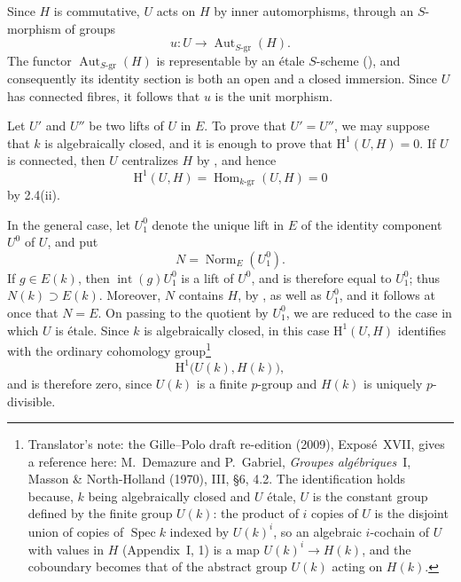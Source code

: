 Since \(H\) is commutative, \(U\) acts on \(H\) by inner
automorphisms, through an \(S\)-morphism of groups
\[
  u:U\longrightarrow\operatorname{Aut}_{S\text{-}\mathrm{gr}}(H).
\]
The functor
\(\operatorname{Aut}_{S\text{-}\mathrm{gr}}(H)\) is representable
by an étale \(S\)-scheme (), and consequently its
identity section is both an open and a closed immersion.  Since
\(U\) has connected fibres, it follows that \(u\) is the unit
morphism.


Let \(U'\) and \(U''\) be two lifts of \(U\) in \(E\).  To prove
that \(U'=U''\), we may suppose that \(k\) is algebraically closed,
and it is enough to prove that \(\mathrm H^1(U,H)=0\).  If \(U\)
is connected, then \(U\) centralizes \(H\) by , and hence
\[
  \mathrm H^1(U,H)
    =\operatorname{Hom}_{k\text{-}\mathrm{gr}}(U,H)=0
\]
by 2.4(ii).

In the general case, let \(U_1^0\) denote the unique lift in \(E\)
of the identity component \(U^0\) of \(U\), and put
\[
  N=\operatorname{Norm}_{E}(U_1^0).
\]
If \(g\in E(k)\), then
\(\operatorname{int}(g)U_1^0\) is a lift of \(U^0\), and is
therefore equal to \(U_1^0\); thus \(N(k)\supset E(k)\).
Moreover, \(N\) contains \(H\), by , as well as \(U_1^0\),
and it follows at once that \(N=E\).  On passing to the quotient
by \(U_1^0\), we are reduced to the case in which \(U\) is étale.
Since \(k\) is algebraically closed, in this case
\(\mathrm H^1(U,H)\) identifies with the ordinary cohomology
group\footnote{Translator's note: the Gille--Polo draft re-edition
(2009), Exposé~XVII, gives a reference here: M.~Demazure and
P.~Gabriel, \emph{Groupes algébriques}~I, Masson \& North-Holland
(1970), III, \S6, 4.2. The identification holds because, \(k\) being
algebraically closed and \(U\) étale, \(U\) is the constant group
defined by the finite group \(U(k)\): the product of \(i\) copies of
\(U\) is the disjoint union of copies of \(\operatorname{Spec}k\)
indexed by \(U(k)^i\), so an algebraic \(i\)-cochain of \(U\) with
values in \(H\) (Appendix~I, 1) is a map \(U(k)^i\to H(k)\), and the
coboundary becomes that of the abstract group \(U(k)\) acting on
\(H(k)\).}
\[
  \mathrm H^1\bigl(U(k),H(k)\bigr),
\]
and is therefore zero, since \(U(k)\) is a finite \(p\)-group and
\(H(k)\) is uniquely \(p\)-divisible.

